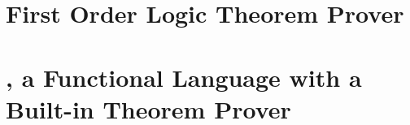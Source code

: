 \section{First Order Logic Theorem Prover}

\section{\Funl{}, a Functional Language with a Built-in Theorem Prover}

